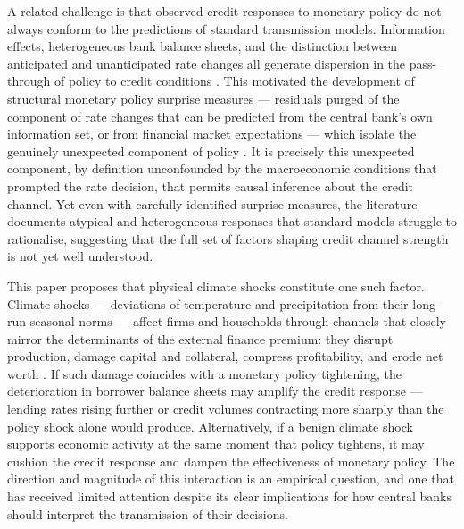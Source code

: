 \documentclass[
  letterpaper,
  DIV=11,
  numbers=noendperiod]{scrartcl}
\begin{document}
A related challenge is that observed credit responses to monetary policy
do not always conform to the predictions of standard transmission
models. Information effects, heterogeneous bank balance sheets, and the
distinction between anticipated and unanticipated rate changes all
generate dispersion in the pass-through of policy to credit conditions
\citep{ALTAVILLA202081, KLEIMEIER20061839}. This motivated the
development of structural monetary policy surprise measures ---
residuals purged of the component of rate changes that can be predicted
from the central bank's own information set, or from financial market
expectations --- which isolate the genuinely unexpected component of
policy \citep{romer2004, miyajima2024}. It is precisely this unexpected
component, by definition unconfounded by the macroeconomic conditions
that prompted the rate decision, that permits causal inference about the
credit channel. Yet even with carefully identified surprise measures,
the literature documents atypical and heterogeneous responses that
standard models struggle to rationalise, suggesting that the full set of
factors shaping credit channel strength is not yet well understood.

This paper proposes that physical climate shocks constitute one such
factor. Climate shocks --- deviations of temperature and precipitation
from their long-run seasonal norms --- affect firms and households
through channels that closely mirror the determinants of the external
finance premium: they disrupt production, damage capital and collateral,
compress profitability, and erode net worth
\citep{dafermos2018, aglietta2016}. If such damage coincides with a
monetary policy tightening, the deterioration in borrower balance sheets
may amplify the credit response --- lending rates rising further or
credit volumes contracting more sharply than the policy shock alone
would produce. Alternatively, if a benign climate shock supports
economic activity at the same moment that policy tightens, it may
cushion the credit response and dampen the effectiveness of monetary
policy. The direction and magnitude of this interaction is an empirical
question, and one that has received limited attention despite its clear
implications for how central banks should interpret the transmission of
their decisions.
\end{document}
